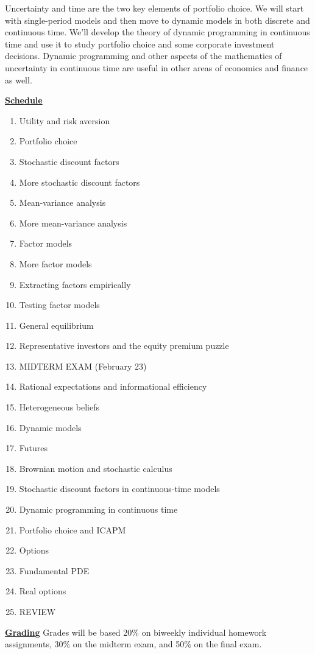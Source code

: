 \documentclass[english,12pt]{amsart}
\newcommand{\head}[1]{\vskip 0.5\baselineskip\underline{\textbf{#1}}\vskip 0.25\baselineskip}
\begin{document}
Uncertainty and time are the two key elements of portfolio choice.  We will start with single-period models and then move to dynamic models in both discrete and continuous time.   We'll develop the theory of dynamic programming in continuous time and use it to study portfolio choice and some corporate investment decisions.  Dynamic programming and other aspects of the mathematics of uncertainty in continuous time are useful in other areas of economics and finance as well.

\newpage
\head{Schedule}

\begin{enumerate}\renewcommand{\labelenumi}{\arabic{enumi}.}
\item Utility and risk aversion
\item Portfolio choice
\item Stochastic discount factors 
\item More stochastic discount factors
\item Mean-variance analysis 
\item More mean-variance analysis 
\item Factor models
\item More factor models
\item Extracting factors empirically
\item Testing factor models
\item General equilibrium
\item Representative investors and the equity premium puzzle
\item MIDTERM EXAM (February 23)
\item Rational expectations and informational efficiency
\item Heterogeneous beliefs
\item Dynamic models
\item Futures
\item Brownian motion and stochastic calculus
\item Stochastic discount factors in continuous-time models
\item Dynamic programming in continuous time
\item Portfolio choice and ICAPM
\item Options
\item Fundamental PDE
\item Real options
\item REVIEW
\end{enumerate}

\head{Grading}
Grades will be based 20\% on biweekly individual homework assignments, 30\% on the midterm exam, and 50\% on the final exam.  
\end{document}
